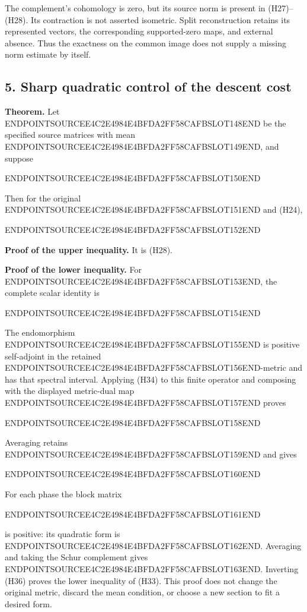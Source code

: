The complement's cohomology is zero, but its source norm is present in (H27)--(H28). Its contraction is not asserted isometric. Split reconstruction retains its represented vectors, the corresponding supported-zero maps, and external absence. Thus the exactness on the common image does not supply a missing norm estimate by itself.

\subsection{5. Sharp quadratic control of the descent cost}\label{endpoint-holonomy_original--sharp-quadratic-control-of-the-descent-cost}

\textbf{Theorem.} Let ENDPOINTSOURCEE4C2E4984E4BFDA2FF58CAFBSLOT148END be the specified source matrices with mean ENDPOINTSOURCEE4C2E4984E4BFDA2FF58CAFBSLOT149END, and suppose

ENDPOINTSOURCEE4C2E4984E4BFDA2FF58CAFBSLOT150END

Then for the original ENDPOINTSOURCEE4C2E4984E4BFDA2FF58CAFBSLOT151END and (H24),

ENDPOINTSOURCEE4C2E4984E4BFDA2FF58CAFBSLOT152END

\textbf{Proof of the upper inequality.} It is (H28).

\textbf{Proof of the lower inequality.} For ENDPOINTSOURCEE4C2E4984E4BFDA2FF58CAFBSLOT153END, the complete scalar identity is

ENDPOINTSOURCEE4C2E4984E4BFDA2FF58CAFBSLOT154END

The endomorphism ENDPOINTSOURCEE4C2E4984E4BFDA2FF58CAFBSLOT155END is positive self-adjoint in the retained ENDPOINTSOURCEE4C2E4984E4BFDA2FF58CAFBSLOT156END-metric and has that spectral interval. Applying (H34) to this finite operator and composing with the displayed metric-dual map ENDPOINTSOURCEE4C2E4984E4BFDA2FF58CAFBSLOT157END proves

ENDPOINTSOURCEE4C2E4984E4BFDA2FF58CAFBSLOT158END

Averaging retains ENDPOINTSOURCEE4C2E4984E4BFDA2FF58CAFBSLOT159END and gives

ENDPOINTSOURCEE4C2E4984E4BFDA2FF58CAFBSLOT160END

For each phase the block matrix

ENDPOINTSOURCEE4C2E4984E4BFDA2FF58CAFBSLOT161END

is positive: its quadratic form is ENDPOINTSOURCEE4C2E4984E4BFDA2FF58CAFBSLOT162END. Averaging and taking the Schur complement gives ENDPOINTSOURCEE4C2E4984E4BFDA2FF58CAFBSLOT163END. Inverting (H36) proves the lower inequality of (H33). This proof does not change the original metric, discard the mean condition, or choose a new section to fit a desired form.

